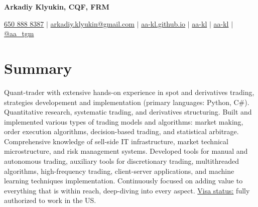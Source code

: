 \documentclass[a4paper,hidelinks]{article}
\begin{document}

\begin{center}
  \textbf{\Huge{Arkadiy Klyukin, CQF, FRM}} \\ \vspace{4pt}
  
  \small
  \faMobile* \hspace{.5pt} \href{tel:+16508888387}{650 888 8387}
  $|$
  \faAt \hspace{.5pt} \href{mailto:arkadiy.klyukin@gmail.com}{arkadiy.klyukin@gmail.com}
  $|$
  \faGlobeAmericas \hspace{.5pt} \href{https://aa-kl.github.io}{aa-kl.github.io}
  $|$
  \faGithub \hspace{.5pt} \href{https://github.com/aa-kl}{aa-kl}
  $|$
  \faLinkedinIn \hspace{.5pt} \href{https://www.linkedin.com/in/aa-kl}{aa-kl}
  $|$
  \faTelegramPlane \hspace{.5pt} \href{https://t.me/aa_tgm}{@aa\_tgm}
\end{center}

\vspace{-12pt}
\section{Summary}
Quant-trader with extensive hands-on experience in spot and derivatives trading, strategies developement and implementation (primary languages: Python, C\#). Quantitative research, systematic trading, and derivatives structuring. Built and implemented various types of trading models and algorithms: market making, order execution algorithms, decision-based trading, and statistical arbitrage. Comprehensive knowledge of sell-side IT infrastructure, market technical microstructure, and risk management systems. Developed tools for manual and autonomous trading, auxiliary tools for discretionary trading, multithreaded algorithms, high-frequency trading, client-server applications, and machine learning techniques implementation. Continuously focused on adding value to everything that is within reach, deep-diving into every aspect. \underline{Visa status:} fully authorized to work in the US.\\
\end{document}
